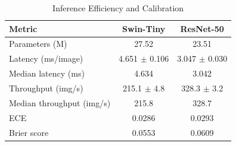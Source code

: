 \begin{table}[t]
\caption{Inference Efficiency and Calibration}
\label{tab:efficiency_calibration}
\centering
\begin{tabular}{lcc}
\hline
Metric & Swin-Tiny & ResNet-50 \\
\hline
Parameters (M) & 27.52 & 23.51 \\
Latency (ms/image) & 4.651 $\pm$ 0.106 & 3.047 $\pm$ 0.030 \\
Median latency (ms) & 4.634 & 3.042 \\
Throughput (img/s) & 215.1 $\pm$ 4.8 & 328.3 $\pm$ 3.2 \\
Median throughput (img/s) & 215.8 & 328.7 \\
ECE & 0.0286 & 0.0293 \\
Brier score & 0.0553 & 0.0609 \\
\hline
\end{tabular}
\end{table}